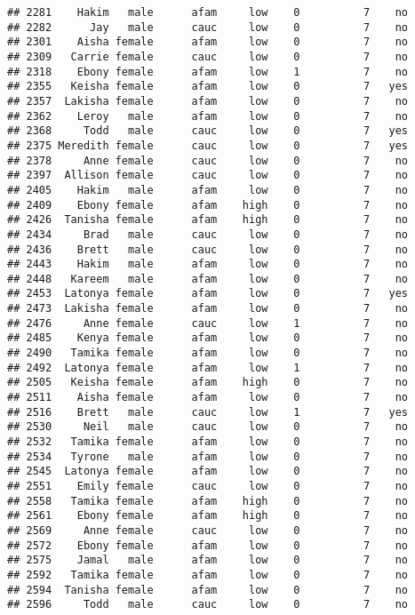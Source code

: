 \documentclass[
]{article}
\begin{document}
\begin{verbatim}
## 2281    Hakim   male      afam     low    0          7    no
## 2282      Jay   male      cauc     low    0          7    no
## 2301    Aisha female      afam     low    0          7    no
## 2309   Carrie female      cauc     low    0          7    no
## 2318    Ebony female      afam     low    1          7    no
## 2355   Keisha female      afam     low    0          7   yes
## 2357  Lakisha female      afam     low    0          7    no
## 2362    Leroy   male      afam     low    0          7    no
## 2368     Todd   male      cauc     low    0          7   yes
## 2375 Meredith female      cauc     low    0          7   yes
## 2378     Anne female      cauc     low    0          7    no
## 2397  Allison female      cauc     low    0          7    no
## 2405    Hakim   male      afam     low    0          7    no
## 2409    Ebony female      afam    high    0          7    no
## 2426  Tanisha female      afam    high    0          7    no
## 2434     Brad   male      cauc     low    0          7    no
## 2436    Brett   male      cauc     low    0          7    no
## 2443    Hakim   male      afam     low    0          7    no
## 2448   Kareem   male      afam     low    0          7    no
## 2453  Latonya female      afam     low    0          7   yes
## 2473  Lakisha female      afam     low    0          7    no
## 2476     Anne female      cauc     low    1          7    no
## 2485    Kenya female      afam     low    0          7    no
## 2490   Tamika female      afam     low    0          7    no
## 2492  Latonya female      afam     low    1          7    no
## 2505   Keisha female      afam    high    0          7    no
## 2511    Aisha female      afam     low    0          7    no
## 2516    Brett   male      cauc     low    1          7   yes
## 2530     Neil   male      cauc     low    0          7    no
## 2532   Tamika female      afam     low    0          7    no
## 2534   Tyrone   male      afam     low    0          7    no
## 2545  Latonya female      afam     low    0          7    no
## 2551    Emily female      cauc     low    0          7    no
## 2558   Tamika female      afam    high    0          7    no
## 2561    Ebony female      afam    high    0          7    no
## 2569     Anne female      cauc     low    0          7    no
## 2572    Ebony female      afam     low    0          7    no
## 2575    Jamal   male      afam     low    0          7    no
## 2592   Tamika female      afam     low    0          7    no
## 2594  Tanisha female      afam     low    0          7    no
## 2596     Todd   male      cauc     low    0          7    no

\end{verbatim}
\end{document}
